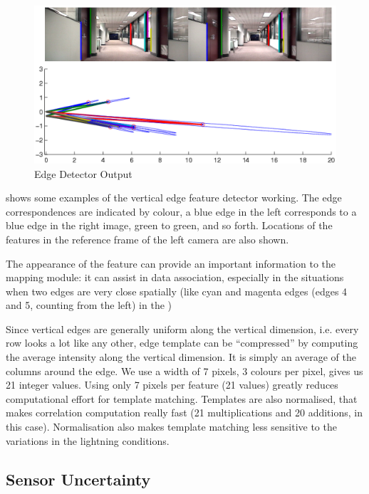 \begin{figure}[htbp]
  \centering
  \includegraphics[width=13cm]{Pics/example_edge_detector}
  \caption{Edge Detector Output}
  \label{fig:example_edge_detector}
\end{figure}

 shows some examples of
the vertical edge feature detector working. The edge correspondences
are indicated by colour, a blue edge in the left corresponds to a blue
edge in the right image, green to green, and so forth. Locations of
the features in the reference frame of the left camera are also shown.

The appearance of the feature can provide an important information to
the mapping module: it can assist in data association, especially in
the situations when two edges are very close spatially (like cyan and
magenta edges (edges 4 and 5, counting from the left) in the
)

Since vertical edges are generally uniform along the vertical
dimension, i.e. every row looks a lot like any other, edge template
can be ``compressed'' by computing the average intensity along the
vertical dimension. It is simply an average of the columns around the
edge. We use a width of 7 pixels, 3 colours per pixel, gives us 21
integer values. Using only 7 pixels per feature (21 values) greatly
reduces computational effort for template matching.  Templates are
also normalised, that makes correlation computation really fast (21
multiplications and 20 additions, in this case). Normalisation also
makes template matching less sensitive to the variations in the
lightning conditions.

\subsection{Sensor Uncertainty}

